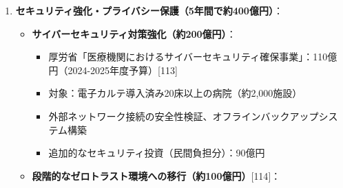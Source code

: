 \documentclass[
  a4paper,
  a4paper,
  11pt]{ltjsbook}
\providecommand{\tightlist}{%
  \setlength{\itemsep}{0pt}\setlength{\parskip}{0pt}}
\begin{document}
\begin{tcolorbox}
\begin{enumerate}
\begin{itemize}
\begin{itemize}
      \begin{itemize}
      \tightlist
      \item
        東京都医療機関デジタル化推進セミナーのような研修を全国展開{[}111{]}
      \item
        全国約8,100病院×研修費10万円（基礎編・実践編）= 約8.1億円
      \item
        オンライン研修プラットフォーム構築・運用費を含む
      \item
        参考：令和6年度補正予算では介護人材確保・職場環境改善等事業に806億円が計上{[}112{]}
      \end{itemize}
    \item
      \textbf{技術支援センター設置・運営（5年間：約10億円）}：

      \begin{itemize}
      \tightlist
      \item
        全国5ブロック（北海道・東北、関東、中部、関西、中国・四国・九州）に設置
      \item
        各センター年間運営費：4,000万円（人件費3名＋運営費）× 5拠点 =
        2億円/年
      \item
        5年間の総額：2億円 × 5年 = 10億円
      \item
        参考：PMDAアジア医薬品・医療機器研修センター（PMDA-ATC）の運営実績{[}89{]}
      \end{itemize}
    \end{itemize}
  \end{itemize}
\item
  \textbf{セキュリティ強化・プライバシー保護（5年間で約400億円）}：

  \begin{itemize}
  \tightlist
  \item
    \textbf{サイバーセキュリティ対策強化（約200億円）}：

    \begin{itemize}
    \tightlist
    \item
      厚労省「医療機関におけるサイバーセキュリティ確保事業」：110億円（2024-2025年度予算）{[}113{]}
    \item
      対象：電子カルテ導入済み20床以上の病院（約2,000施設）
    \item
      外部ネットワーク接続の安全性検証、オフラインバックアップシステム構築
    \item
      追加的なセキュリティ投資（民間負担分）：90億円
    \end{itemize}
  \item
    \textbf{段階的なゼロトラスト環境への移行（約100億円）}{[}114{]}：


\end{itemize}
\end{enumerate}
\end{tcolorbox}
\end{document}
